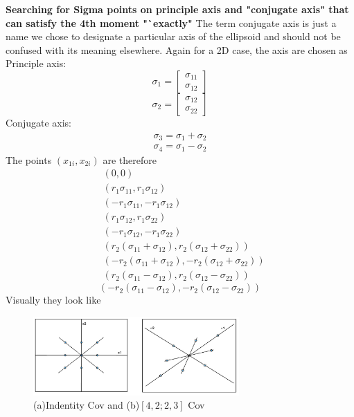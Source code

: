 \documentclass{article}
\begin{document}
{\bf Searching for Sigma points on principle axis and "conjugate axis" that can satisfy the 4th moment "`exactly"}\newline
	The term conjugate axis is just a name we chose to designate a particular axis of the ellipsoid and should not be confused with its meaning elsewhere. Again for a 2D case, the axis are chosen as\newline
	Principle axis:
\[\sigma_1=\left[ {\begin{array}{c}
 \sigma_{11}\\
 \sigma_{12}
 \end{array} } \right]\]
 \[\sigma_2=\left[ {\begin{array}{c}
 \sigma_{12}\\
 \sigma_{22}
 \end{array} } \right]\]
 Conjugate axis:
 \begin{align}
 \sigma_3=\sigma_1+\sigma_2\\
 \sigma_4=\sigma_1-\sigma_2
 \end{align}
 The points $(x_{1i},x_{2i})$ are therefore
  \begin{align*}
 &(0,0)\\
 &(r_1\sigma_{11},r_1\sigma_{12})\\
 &(-r_1\sigma_{11},-r_1\sigma_{12})\\
 &(r_1\sigma_{12},r_1\sigma_{22})\\
 &(-r_1\sigma_{12},-r_1\sigma_{22})\\
 &(r_2(\sigma_{11}+\sigma_{12}),r_2(\sigma_{12}+\sigma_{22}))\\
 &(-r_2(\sigma_{11}+\sigma_{12}),-r_2(\sigma_{12}+\sigma_{22}))\\
 &(r_2(\sigma_{11}-\sigma_{12}),r_2(\sigma_{12}-\sigma_{22}))
  \end{align*}
  \begin{equation}
 (-r_2(\sigma_{11}-\sigma_{12}),-r_2(\sigma_{12}-\sigma_{22}))\label{eq:points2}
\end{equation}
 Visually they look like \newline\newline
\begin{figure}[h]
  \centering
	\includegraphics[width=0.7\textwidth]{2d4thmom.jpg}
	\caption{(a)Indentity Cov and (b)$[4,2;2,3]$ Cov}
	\label{fig:eye2quadpts}
\end{figure}\newline
\end{document}
